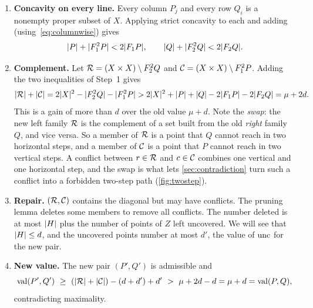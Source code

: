 \begin{enumerate}[label=\textbf{\arabic*.},leftmargin=*]
\item \textbf{Concavity on every line.} Every column $P_j$ and every row $Q_i$ is a
nonempty proper subset of $X$. Applying strict concavity to each and adding
(using~\eqref{eq:columnwise}) gives
\[
 \lvert P\rvert+\lvert F_1^2P\rvert<2\lvert F_1 P\rvert,\qquad \lvert Q\rvert+\lvert F_2^2Q\rvert<2\lvert F_2 Q\rvert.
\]
\item \textbf{Complement.} Let $\mathcal R=(X\times X)\setminus F_2^2Q$ and $\mathcal C=(X\times X)\setminus F_1^2P$.
Adding the two inequalities of Step~1 gives
\[
 \lvert \mathcal R\rvert+\lvert \mathcal C\rvert=2\lvert X\rvert^2-\lvert F_2^2Q\rvert-\lvert F_1^2P\rvert
 >2\lvert X\rvert^2+\lvert P\rvert+\lvert Q\rvert-2\lvert F_1 P\rvert-2\lvert F_2 Q\rvert=\mu+2d .
\]
This is a gain of more than $d$ over the old value $\mu+d$.
Note the \emph{swap}: the new left family $\mathcal R$ is the complement of a set
built from the old \emph{right} family $Q$, and vice versa. So a member of
$\mathcal R$ is a point that $Q$ cannot reach in two horizontal steps, and a member
of $\mathcal C$ is a point that $P$ cannot reach in two vertical steps. A conflict
between $r\in\mathcal R$ and $c\in\mathcal C$ combines one vertical and one horizontal
step, and the swap is what lets \cref{sec:contradiction} turn such a
conflict into a forbidden two-step path (\cref{fig:twostep}).
\item \textbf{Repair.} $(\mathcal R,\mathcal C)$ contains the diagonal but may have conflicts. The
pruning lemma deletes some members to remove all conflicts. The number
deleted is at most $\lvert H\rvert$ plus the number of points of $Z$ left
uncovered. We will see that $\lvert H\rvert\le d$, and the uncovered points number
at most $d'$, the value of $\operatorname{unc}$ for the new pair.
\item \textbf{New value.} The new pair $(P',Q')$ is admissible and
\[
 \val(P',Q')\ \ge\ (\abs\Rf+\abs\Cf)-(d+d')+d'\ >\ \mu+2d-d=\mu+d=\val(P,Q),
\]
contradicting maximality.
\end{enumerate}

